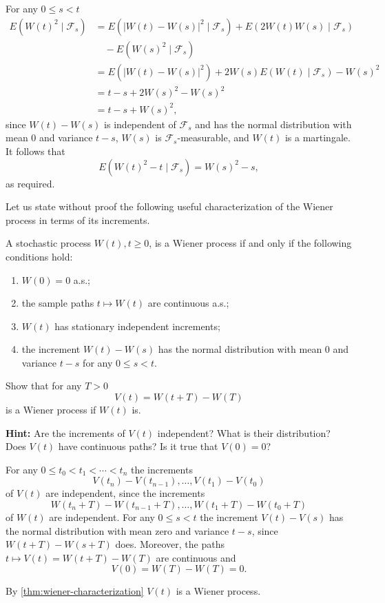 \begin{Solution}
For any $0 \leq s < t$
\begin{equation}
\begin{aligned}
E(W(t)^2 \mid \mathcal{F}_s) &= E(|W(t) - W(s)|^2 \mid \mathcal{F}_s) + E(2W(t)W(s) \mid \mathcal{F}_s) \\
&\quad - E(W(s)^2 \mid \mathcal{F}_s) \\
&= E(|W(t) - W(s)|^2) + 2W(s)E(W(t) \mid \mathcal{F}_s) - W(s)^2 \\
&= t - s + 2W(s)^2 - W(s)^2 \\
&= t - s + W(s)^2,
\end{aligned}
\end{equation}
since $W(t) - W(s)$ is independent of $\mathcal{F}_s$ and has the normal distribution with mean 0 and variance $t - s$, $W(s)$ is $\mathcal{F}_s$-measurable, and $W(t)$ is a martingale. It follows that
\[
E(W(t)^2 - t \mid \mathcal{F}_s) = W(s)^2 - s,
\]
as required.
\end{Solution}

Let us state without proof the following useful characterization of the Wiener process in terms of its increments.

\begin{Theorem}
\label{thm:wiener-characterization}
A stochastic process $W(t), t \geq 0$, is a Wiener process if and only if the following conditions hold:
\begin{enumerate}
\item $W(0) = 0$ a.s.;
\item the sample paths $t \mapsto W(t)$ are continuous a.s.;
\item $W(t)$ has stationary independent increments;
\item the increment $W(t) - W(s)$ has the normal distribution with mean 0 and variance $t - s$ for any $0 \leq s < t$.
\end{enumerate}
\end{Theorem}

\begin{Exercise}
\label{ex:wiener-time-shift}
Show that for any $T > 0$
\[
V(t) = W(t + T) - W(T)
\]
is a Wiener process if $W(t)$ is.

\noindent\textbf{Hint:} Are the increments of $V(t)$ independent? What is their distribution? Does $V(t)$ have continuous paths? Is it true that $V(0) = 0$?
\end{Exercise}

\begin{Solution}
For any $0 \leq t_0 < t_1 < \cdots < t_n$ the increments
\[
V(t_n) - V(t_{n-1}), \ldots, V(t_1) - V(t_0)
\]
of $V(t)$ are independent, since the increments
\[
W(t_n + T) - W(t_{n-1} + T), \ldots, W(t_1 + T) - W(t_0 + T)
\]
of $W(t)$ are independent. For any $0 \leq s < t$ the increment $V(t) - V(s)$ has the normal distribution with mean zero and variance $t - s$, since $W(t + T) - W(s + T)$ does. Moreover, the paths $t \mapsto V(t) = W(t + T) - W(T)$ are continuous and
\[
V(0) = W(T) - W(T) = 0.
\]

By \cref{thm:wiener-characterization} $V(t)$ is a Wiener process.
\end{Solution}

